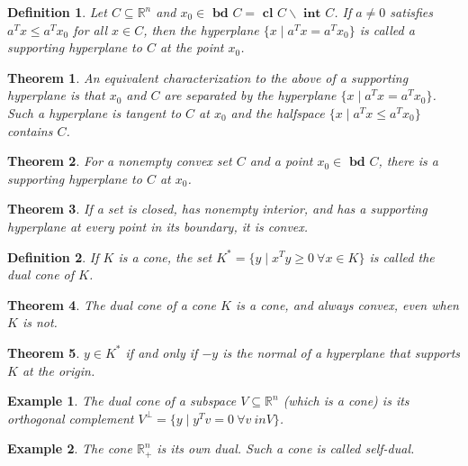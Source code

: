 \documentclass[a4paper]{article}
\newtheorem{mytheorem}{Theorem}
\newtheorem{example}{Example}
\newtheorem{mydef}{Definition}
\numberwithin{mytheorem}{section}
\numberwithin{mydef}{section}
\numberwithin{example}{section}
\begin{document}
\begin{mydef} Let $C \subseteq \mathbb{R}^{n}$ and $x_{0} \in \textbf{ bd } C = \textbf{ cl } C \backslash \textbf{ int } C$. If $a \neq 0$ satisfies $a^{T}x \leq a^{T}x_{0}$ for all $x \in C$, then the hyperplane $\{ x \mid a^{T}x = a^{T}x_{0} \}$ is called a supporting hyperplane to $C$ at the point $x_{0}$. \end{mydef}

\begin{mytheorem} An equivalent characterization to the above of a supporting hyperplane is that $x_{0}$ and $C$ are separated by the hyperplane $\{ x \mid a^{T}x = a^{T}x_{0}\}$. Such a hyperplane is tangent to $C$ at $x_{0}$ and the halfspace $\{ x \mid a^{T}x \leq a^{T}x_{0} \}$ contains $C$. \end{mytheorem}

\begin{mytheorem} For a nonempty convex set $C$ and a point $x_{0} \in \textbf{ bd } C$, there is a supporting hyperplane to $C$ at $x_{0}$. \end{mytheorem}

\begin{mytheorem} If a set is closed, has nonempty interior, and has a supporting hyperplane at every point in its boundary, it is convex. \end{mytheorem}

\begin{mydef} If $K$ is a cone, the set $K^{*} = \{ y \mid x^{T}y \geq 0 \ \forall x \in K \}$ is called the dual cone of $K$. \end{mydef}

\begin{mytheorem} The dual cone of a cone $K$ is a cone, and always convex, even when $K$ is not. \end{mytheorem}

\begin{mytheorem} $y \in K^{*}$ if and only if $-y$ is the normal of a hyperplane that supports $K$ at the origin. \end{mytheorem}

\begin{example} The dual cone of a subspace $V \subseteq \mathbb{R}^{n}$ (which is a cone) is its orthogonal complement $V^{\bot} = \{ y \mid y^{T}v = 0 \ \forall v \ in V \}$.  
\end{example}

\begin{example} The cone $\mathbb{R}^{n}_{+}$ is its own dual. Such a cone is called self-dual.
\end{example}
\end{document}
